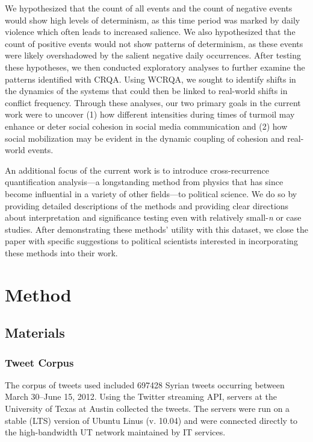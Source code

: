 \documentclass[english,man]{apa6}
\begin{document}
We hypothesized that the count of all events and the count of negative
events would show high levels of determinism, as this time period was
marked by daily violence which often leads to increased salience. We also
hypothesized that the count of positive events would not show patterns of
determinism, as these events were likely overshadowed by the salient
negative daily occurrences.
After testing these hypotheses, we then conducted exploratory analyses
to further examine the patterns identified with CRQA. Using WCRQA,
we sought to identify shifts in the
dynamics of the systems that could then be linked to real-world shifts in
conflict frequency.
Through these analyses, our two primary goals in the current work were to uncover
(1) how different intensities during times of turmoil may enhance or deter
social cohesion in social media communication and (2) how social mobilization
may be evident in the dynamic coupling of cohesion and real-world events.

An additional focus of the current work is to introduce cross-recurrence
quantification analysis---a longstanding method from physics that has
since become influential in a variety of other fields---to political
science. We do so by providing detailed descriptions of the methods and
providing clear directions about interpretation and significance testing
even with relatively small-\emph{n} or case studies. After demonstrating these
methods' utility with this dataset, we close the paper with specific
suggestions to political scientists interested in incorporating these
methods into their work.

\hypertarget{method}{%
\section{Method}\label{method}}

\hypertarget{materials}{%
\subsection{Materials}\label{materials}}

\hypertarget{tweet-corpus}{%
\subsubsection{Tweet Corpus}\label{tweet-corpus}}

The corpus of tweets used included 697428 Syrian tweets
occurring between March 30--June 15, 2012. Using the Twitter
streaming API, servers at the University of Texas at Austin collected
the tweets. The servers were run on a stable (LTS) version of Ubuntu
Linus (v. 10.04) and were connected directly to the high-bandwidth UT network
maintained by IT services.
\end{document}
